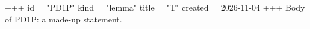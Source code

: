 +++
id = "PD1P"
kind = "lemma"
title = "T"
created = 2026-11-04
+++
Body of PD1P: a made-up statement.
